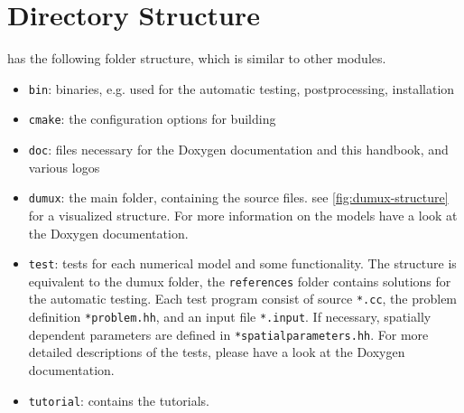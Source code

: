 \section{Directory Structure}
\label{sc_structure}

\Dumux has the following folder structure, which is similar to other \Dune modules.
\begin{itemize}
\item \texttt{bin}: binaries, e.g. used for the automatic testing, postprocessing, installation
\item \texttt{cmake}: the configuration options for building \Dumux
\item \texttt{doc}: files necessary for the Doxygen documentation and this handbook, and various logos
\item \texttt{dumux}: the main folder, containing the source files. see \ref{fig:dumux-structure}
      for a visualized structure. For more information on the models have a look at the
      Doxygen documentation.
\item \texttt{test}: tests for each numerical model and some functionality.
      The structure is equivalent to the dumux folder, the \texttt{references} folder
      contains solutions for the automatic testing. Each test program consist of source
      \texttt{*.cc}, the problem definition \texttt{*problem.hh}, and an input file \texttt{*.input}.
      If necessary, spatially dependent parameters are defined in \texttt{*spatialparameters.hh}.
      For more detailed descriptions of the tests, please have a look at the Doxygen documentation.
\item \texttt{tutorial}: contains the tutorials.
\end{itemize}


